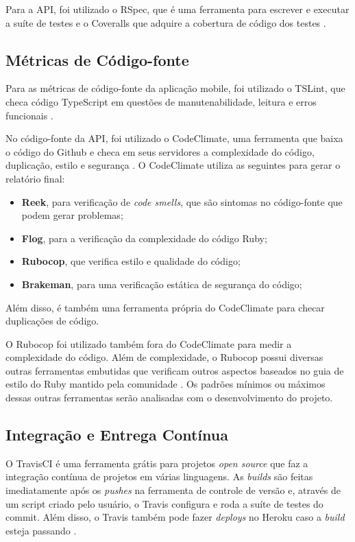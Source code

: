 Para a API, foi utilizado o RSpec, que é uma ferramenta para escrever e executar a suíte de testes \cite{rspec} e o Coveralls que adquire a cobertura de código dos testes \cite{coveralls}.

\subsection{Métricas de Código-fonte}
Para as métricas de código-fonte da aplicação mobile, foi utilizado o TSLint, que checa código TypeScript em questões de manutenabilidade, leitura e erros funcionais \cite{tslint}.

No código-fonte da API, foi utilizado o CodeClimate, uma ferramenta que baixa o código do Github e checa em seus servidores a complexidade do código, duplicação, estilo e segurança \cite{codeclimate}. O CodeClimate utiliza as seguintes para gerar o relatório final:
\begin{itemize}
    \item \textbf{Reek}, para verificação de \textit{code smells}, que são sintomas no código-fonte que podem gerar problemas;
    \item \textbf{Flog}, para a verificação da complexidade do código Ruby;
    \item \textbf{Rubocop}, que verifica estilo e qualidade do código;
    \item \textbf{Brakeman}, para uma verificação estática de segurança do código;
\end{itemize}

Além disso, é também uma ferramenta própria do CodeClimate para checar duplicações de código.

O Rubocop foi utilizado também fora do CodeClimate para medir a complexidade do código. Além de complexidade, o Rubocop possui diversas outras ferramentas embutidas que verificam outros aspectos baseados no guia de estilo do Ruby mantido pela comunidade \cite{rubocop}. Os padrões mínimos ou máximos dessas outras ferramentas serão analisadas com o desenvolvimento do projeto.

\subsection{Integração e Entrega Contínua}

O TravisCI é uma ferramenta grátis para projetos \textit{open source} que faz a integração contínua de projetos em várias linguagens. As \textit{builds} são feitas imediatamente após os \textit{pushes} na ferramenta de controle de versão e, através de um script criado pelo usuário, o Travis configura e roda a suíte de testes do commit. Além disso, o Travis também pode fazer \textit{deploys} no Heroku caso a \textit{build} esteja passando \cite{travis-ci}. 

